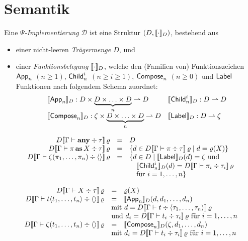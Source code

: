 \documentclass[12pt,a4paper,draft]{article}
\DeclareMathOperator{\as}{\textbf{as}}
\newcommand{\any}{\textbf{any}}
\newcommand{\Tj}[3]{{#1}\vdash{#2}\div{#3}}
\begin{document}
\section*{Semantik}

Eine \emph{$\Psi$-Implementierung} $\mathcal{D}$ ist eine Struktur $(D,[\![\cdot]\!]_D)$, bestehend aus
\begin{itemize}
\item einer nicht-leeren \emph{Tr\"agermenge $D$}, und
\item einer \emph{Funktionsbelegung $[\![\cdot]\!]_D$}, welche den (Familien von) Funktionszeichen
  $\mathsf{App}_n$ $(n \ge 1)$, $\mathsf{Child}_n^i$ $(n \ge i \ge 1)$, $\mathsf{Compose}_n$ $(n \ge 0)$ und $\mathsf{Label}$ Funktionen
  nach folgendem Schema zuordnet:
  \[\begin{array}{ll}
    \sem{\App_n}_D: D \times \underbrace{D \times \ldots \times D}_n \pto D &
    \sem{\Child_n^i}_D: D \pto D \\
    \sem{\Compose_n}_D: \zeta \times \underbrace{D \times \ldots \times D}_n \pto D &
    \sem{\Label}_D: D \pto \zeta \\
  \end{array}\]
\end{itemize}

\[\begin{array}{rcl}
  D\sem{\Tj{\Gamma}{\any}{\tau}}\,\varrho
  &=& D
  \\
  D\sem{\Tj{\Gamma}{\pi \as X}{\tau}}\,\varrho
  &=& \{d \in D\sem{\Tj{\Gamma}{\pi}{\tau}}\,\varrho \mid d = \varrho(X) \}
  \\
  D\sem{\Tj{\Gamma}{\zeta(\pi_1,\ldots,\pi_n)}{\langle \rangle}}\,\varrho
  &=& \{ d \in D \mid \sem{\Label}_D(d) = \zeta \text{ und} \\
  && \quad \sem{\Child_n^i}_D(d) = D\sem{\Tj{\Gamma}{\pi_i}{\tau_i}}\,\varrho \\
  && \quad \text{f\"ur $i=1,\ldots,n$} \}
  \\
\end{array}\]

\[\begin{array}{rcl}
  D\sem{\Tj{\Gamma}{X}{\tau}}\,\varrho
  &=& \varrho(X)
  \\
  D\sem{\Tj{\Gamma}{t \langle t_1,\ldots,t_n \rangle}{\langle \rangle}}\,\varrho
  &=& \sem{\App_n}_D(d, d_1, \ldots, d_n) \\
  & \multicolumn{2}{l}{\text{mit } d = D\sem{\Tj{\Gamma}{t}{\langle\tau_1,\ldots,\tau_n\rangle}}\,\varrho} \\
  & \multicolumn{2}{l}{\text{und } d_i = D\sem{\Tj{\Gamma}{t_i}{\tau_i}}\,\varrho \text{ f\"ur $i=1,\ldots,n$}}
  \\
  D\sem{\Tj{\Gamma}{\zeta(t_1,\ldots,t_n)}{\langle \rangle}}\,\varrho
  &=& \sem{\Compose_n}_D(\zeta,d_1,\ldots,d_n) \\
  & \multicolumn{2}{l}{\text{mit } d_i = D\sem{\Tj{\Gamma}{t_i}{\tau_i}}\,\varrho \text{ f\"ur $i=1,\ldots,n$}}
  \\
\end{array}\]
\end{document}
